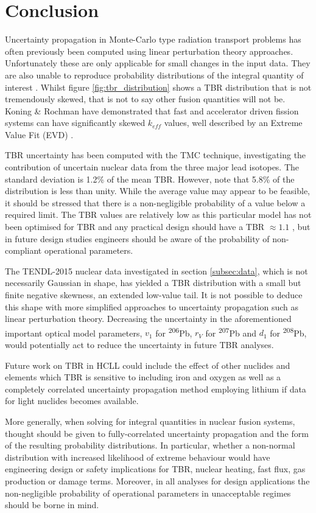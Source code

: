 \section{Conclusion}
Uncertainty propagation in Monte-Carlo type radiation transport problems has often previously been computed using linear perturbation theory approaches. Unfortunately these are only applicable for small changes in the input data. They are also unable to reproduce probability distributions of the integral quantity of interest \cite{Rising2012}. Whilst figure \ref{fig:tbr_distribution} shows a TBR distribution that is not tremendously skewed, that is not to say other fusion quantities will not be. Koning \& Rochman have demonstrated that fast and accelerator driven fission systems can have significantly skewed $k_{eff}$ values, well described by an Extreme Value Fit (EVD) \cite{Koning2008}.

TBR uncertainty has been computed with the TMC technique, investigating the contribution of uncertain nuclear data from the three major lead isotopes. The standard deviation is 1.2\% of the mean TBR. However, note that 5.8\% of the distribution is less than unity. While the average value may appear to be feasible, it should be stressed that there is a non-negligible probability of a value below a required limit. The TBR values are relatively low as this particular model has not been optimised for TBR and any practical design should have a TBR $\approx 1.1$ \cite{Fischer2015}, but in future design studies engineers should be aware of the probability of non-compliant operational parameters. 

The TENDL-2015 nuclear data investigated in section \ref{subsec:data}, which is not necessarily Gaussian in shape, has yielded a TBR distribution with a small but finite negative skewness, an extended low-value tail. It is not possible to deduce this shape with more simplified approaches to uncertainty propagation such as linear perturbation theory. Decreasing the uncertainty in the aforementioned important optical model parameters, $v_{1}$ for \textsuperscript{206}Pb, $r_{V}$ for \textsuperscript{207}Pb and $d_{1}$ for \textsuperscript{208}Pb, would potentially act to reduce the uncertainty in future TBR analyses.

Future work on TBR in HCLL could include the effect of other nuclides and elements which TBR is sensitive to including iron and oxygen as well as a completely correlated uncertainty propagation method employing lithium if data for light nuclides becomes available.

More generally, when solving for integral quantities in nuclear fusion systems, thought should be given to fully-correlated uncertainty propagation and the form of the resulting probability distributions. In particular, whether a non-normal distribution with increased likelihood of extreme behaviour would have engineering design or safety implications for TBR, nuclear heating, fast flux, gas production or damage terms. Moreover, in all analyses for design applications the non-negligible probability of operational parameters in unacceptable regimes should be borne in mind.

